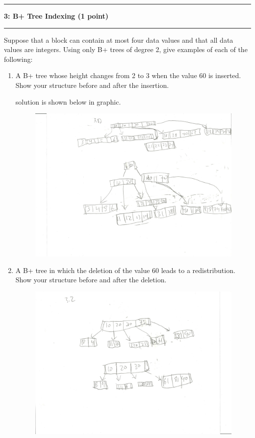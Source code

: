 \documentclass[11pt]{article}
\newcommand\question[2]{\vspace{.25in}\hrule\textbf{#1: #2}\vspace{.5em}\hrule\vspace{.10in}}
\begin{document}
\question{3}{B+ Tree Indexing (1 point)}
Suppose that a block can contain at most four data values and that all data values are integers. Using only B+ trees of degree 2, give examples of each of the following:
\begin{enumerate}
	\item A B+ tree whose height changes from 2 to 3 when the value 60 is inserted. Show your structure before and after the insertion.
	
	solution is shown below in graphic.\\
	\begin{figure}
		\includegraphics[width=\textwidth]{threePointOne.jpeg}
	\end{figure}
	
	
	\item A B+ tree in which the deletion of the value 60 leads to a redistribution. Show your structure before and after the deletion.
		\begin{figure}	
			\includegraphics[width=\textwidth]{threePointTwo.jpeg}
		\end{figure}
	
	

\end{enumerate}
\end{document}
